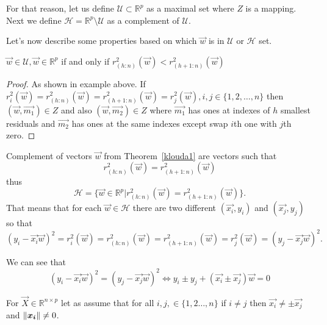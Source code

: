 For that reason, let us define  $\mathcal{U} \subset \mathbb{R}^{p}$ as a maximal set where $Z$ is a mapping. Next we define 
$\mathcal{H} = \mathbb{R}^{p}  \setminus   \mathcal{U}$
as a complement of $\mathcal{U}$.

Let's now describe some properties based on which $\vec{w}$ is in $\mathcal{U}$ or $\mathcal{H}$ set.

\begin{theorem} \label{klouda1}
    $\vec{w} \in \mathcal{U}, \vec{w} \in \mathbb{R}^{p}$ if and only if 
    $r^{2}_{(h:n)}(\vec{w}) < r^{2}_{(h+1:n)}(\vec{w})$
\end{theorem}
\begin{proof}
    As shown in example above. If $r^{2}_{i}(\vec{w}) = r^{2}_{(h:n)}(\vec{w}) = r^{2}_{(h+1:n)}(\vec{w}) = r^{2}_{j}(\vec{w}), i,j \in   \{{1,2,\ldots , n\}} $ then $(\vec{w}, \vec{m_1}) \in Z$ and also $(\vec{w}, \vec{m_2}) \in Z$ where $\vec{m_1}$ has ones at indexes of $h$ smallest residuals and $\vec{m_2}$ has ones at the same indexes except swap $i$th one with $j$th zero.
\end{proof}

\begin{corollary}
    Complement of vectors $\vec{w}$ from Theorem~\ref{klouda1} are vectors such that 
    \begin{equation}
        r^{2}_{(h:n)}(\vec{w}) = r^{2}_{(h+1:n)}(\vec{w})
    \end{equation}
    thus
    \begin{equation}
        \mathcal{H} = \{{ \vec{w} \in \mathbb{R}^{p} | r^{2}_{(h:n)}(\vec{w}) = r^{2}_{(h+1:n)}(\vec{w}) \}}.
    \end{equation}
    That means that for each $\vec{w} \in \mathcal{H}$ there are two different $(\vec{x_i}, y_i)$ and  $(\vec{x_j}, y_j)$ so that
    \begin{equation}
        (y_i - \vec{x_i} \vec{w})^2 = r^{2}_i(\vec{w}) =  r^{2}_{(h:n)}(\vec{w}) = r^{2}_{(h+1:n)}(\vec{w}) =  r^{2}_j(\vec{w}) = (y_j - \vec{x_j} \vec{w})^2.
    \end{equation}

    We can see that 
    \begin{equation}
        (y_i - \vec{x_i} \vec{w})^2 =  (y_j - \vec{x_j} \vec{w})^2 \iff      y_i \pm y_j + (\vec{x_i} \pm \vec{x_j})  \vec{w} = 0
    \end{equation}
\end{corollary}


\begin{assumption} \label{klouda:asump:1}
    For $\vec{X} \in \mathbb{R}^{n \times p}$ let as assume that for all $i,j, \in \{{1,2 \ldots, n \}}$  if $ i \neq j$ then $\vec{x_i} \neq \pm \vec{x_j}$ and $\left\lVert\boldsymbol{x_i}\right\rVert \neq 0$.
\end{assumption}


